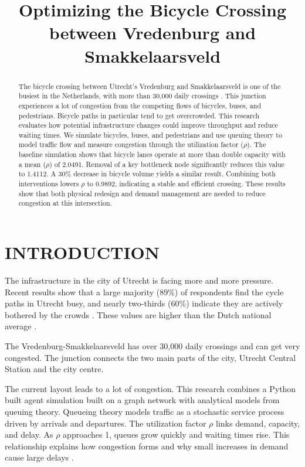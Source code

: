 \documentclass[letterpaper, 10 pt, conference]{ieeeconf}
\title{\LARGE \bf
Optimizing the Bicycle Crossing between Vredenburg and Smakkelaarsveld
}
\author{\IEEEauthorblockN{Gijs van Dijk}
\IEEEauthorblockA{\\{Utrecht University}\\}}
\begin{document}
\maketitle

\thispagestyle{empty}
\pagestyle{empty}


\begin{abstract}

The bicycle crossing between Utrecht’s Vredenburg and Smakkelaarsveld is one of
the busiest in the Netherlands, with more than 30,000 daily crossings \parencite{utrect-2019}. This junction experiences a lot of congestion from the competing flows of bicycles, buses, and pedestrians. Bicycle paths in particular tend to get overcrowded. This research evaluates how potential infrastructure changes could improve throughput and reduce waiting times. We simulate bicycles, buses, and pedestrians and use queuing theory to model traffic flow and measure congestion through the utilization factor ($\rho$). The baseline simulation shows that bicycle lanes operate at more than double capacity with a mean ($\rho$) of 2.0491. Removal of a key bottleneck node significantly reduces this value to 1.4112. A 30\% decrease in bicycle volume yields a similar result. Combining both interventions lowers $\rho$ to 0.9892, indicating a stable and efficient crossing. These results show that both physical redesign and demand management are needed to reduce congestion at this intersection.

\end{abstract}


\section{INTRODUCTION}

The infrastructure in the city of Utrecht is facing more and more pressure. Recent results show that a large majority (89\%) of respondents find
the cycle paths in Utrecht busy, and nearly two-thirds (60\%) indicate they are
actively bothered by the crowds \parencite{winter-2020}. These values are higher than the Dutch national average \parencite{winter-2020}.

The Vredenburg-Smakkelaarsveld  has over 30,000 daily crossings \parencite{utrect-2019} and can get very congested. The junction connects the two main parts of the city, Utrecht Central Station and the city centre.
 
The current layout leads to a lot of congestion. This research combines a Python built agent simulation built on a graph network with analytical models
from queuing theory. Queueing theory models traffic as a stochastic service process driven by arrivals and departures. The utilization factor $\rho$ links demand, capacity, and delay. As $\rho$ approaches 1, queues grow quickly and waiting times rise. This relationship explains how congestion forms and why small increases in demand cause large delays \parencite{VANDAELE2000121}.
\end{document}

